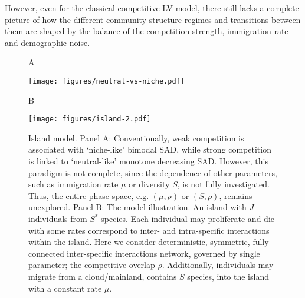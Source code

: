 \documentclass[9pt,twocolumn,twoside,lineno]{pnas-new}
\begin{document}
However, even for the classical competitive LV model, there still lacks a complete picture of how the different community structure regimes and transitions between them are shaped by the balance of the competition strength, immigration rate and demographic noise.

\begin{figure}[t!]
   \begin{flushleft}
        A
   \end{flushleft}
    \texttt{[image: figures/neutral-vs-niche.pdf]}
    \begin{flushleft}
        B
   \end{flushleft}
    \texttt{[image: figures/island-2.pdf]}
    \caption{Island model.  Panel A: Conventionally, weak competition is associated with `niche-like' bimodal SAD, while strong competition is linked to `neutral-like' monotone decreasing SAD. However, this paradigm is not complete, since the dependence of other parameters, such as immigration rate $\mu$ or diversity $S$, is not fully investigated. Thus, the entire phase space, e.g. $(\mu, \rho)$ or $(S, \rho)$,  remains unexplored. Panel B: The model illustration. An island with $J$ individuals from $S^*$ species.  Each individual may proliferate and die with some rates correspond to inter- and intra-specific interactions within the island. Here we consider deterministic, symmetric, fully-connected inter-specific interactions network, governed by single parameter; the competitive overlap $\rho$. Additionally, individuals may migrate from a cloud/mainland, contains $S$ species, into the island with a constant rate $\mu$.       }
    \label{fig:fig1}
\end{figure}
\end{document}
